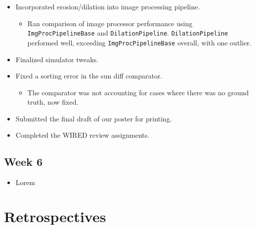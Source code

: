 \documentclass[10pt, onecolumn, draftclsnofoot, letterpaper, compsoc]{IEEEtran}
\begin{document}
    \begin{itemize}

	\item Incorporated erosion/dilation into image processing pipeline.

	\begin{itemize}
		\item Ran comparison of image processor performance using \texttt{ImgProcPipelineBase} and
		\texttt{DilationPipeline}. \texttt{DilationPipeline} performed well, exceeding \texttt{ImgProcPipelineBase}
		overall, with one outlier.
	\end{itemize}

	\item Finalized simulator tweaks.

	\item Fixed a sorting error in the sun diff comparator.

	\begin{itemize}
		\item The comparator was not accounting for cases where there was no ground truth, now fixed.
	\end{itemize}

	\item Submitted the final draft of our poster for printing.

	\item Completed the WIRED review assignments.

    \end{itemize}

\subsection{Week 6}

    \begin{itemize}

	\item Lorem

    \end{itemize}

\newpage
\section{Retrospectives}
\end{document}
